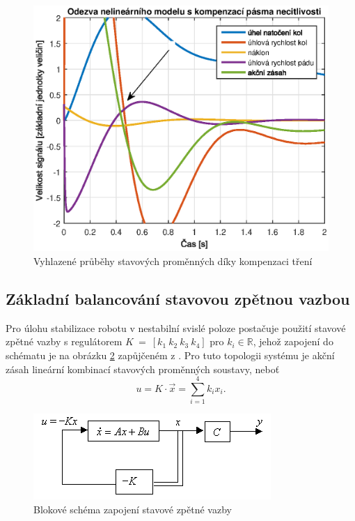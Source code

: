 \documentclass[conference]{IEEEtran}
\begin{document}
\begin{figure}[htbp]
    \centerline{\includegraphics[width=\linewidth]{regulace_kompenzace_treni.eps}}
    \caption{Vyhlazené průběhy stavových proměnných díky kompenzaci tření}
    \label{fig:kompenzace_treni}        
\end{figure}

\subsection{Základní balancování stavovou zpětnou vazbou}
Pro úlohu stabilizace robotu v nestabilní svislé poloze postačuje použití stavové zpětné vazby s regulátorem $K~=~\left[ k_1 ~ k_2 ~ k_3 ~ k_4 \right]$
pro $k_i \in \mathbb{R}$, jehož zapojení do schématu je na obrázku \ref{fig:stavova_zv} zapůjčeném z \cite{img:full_state_feedback}.
Pro tuto topologii systému je akční zásah lineární kombinací stavových proměnných soustavy, neboť
\begin{equation}
    u = K \cdot \vec{x} = \sum_{i=1}^4 k_i x_i.
\end{equation}

\begin{figure}[htbp]
    \centerline{\includegraphics[width=\linewidth]{full_state_feedback_schematic.png}}
    \caption{Blokové schéma zapojení stavové zpětné vazby}
    \label{fig:stavova_zv}        
\end{figure}
\end{document}
